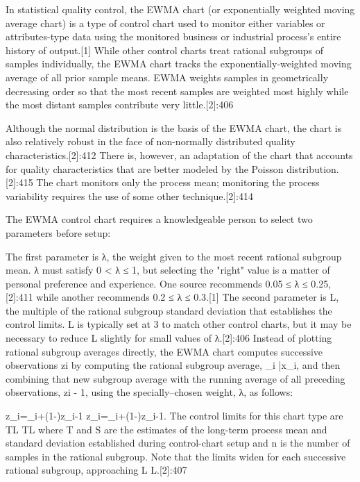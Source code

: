 In statistical quality control, the EWMA chart (or exponentially weighted moving average chart) is a type of control chart used to monitor either variables or attributes-type data using the monitored business or industrial process's entire history of output.[1] While other control charts treat rational subgroups of samples individually, the EWMA chart tracks the exponentially-weighted moving average of all prior sample means. EWMA weights samples in geometrically decreasing order so that the most recent samples are weighted most highly while the most distant samples contribute very little.[2]:406

Although the normal distribution is the basis of the EWMA chart, the chart is also relatively robust in the face of non-normally distributed quality characteristics.[2]:412 There is, however, an adaptation of the chart that accounts for quality characteristics that are better modeled by the Poisson distribution.[2]:415 The chart monitors only the process mean; monitoring the process variability requires the use of some other technique.[2]:414

The EWMA control chart requires a knowledgeable person to select two parameters before setup:

The first parameter is λ, the weight given to the most recent rational subgroup mean. λ must satisfy 0 < λ ≤ 1, but selecting the "right" value is a matter of personal preference and experience. One source recommends 0.05 ≤ λ ≤ 0.25,[2]:411 while another recommends 0.2 ≤ λ ≤ 0.3.[1]
The second parameter is L, the multiple of the rational subgroup standard deviation that establishes the control limits. L is typically set at 3 to match other control charts, but it may be necessary to reduce L slightly for small values of λ.[2]:406
Instead of plotting rational subgroup averages directly, the EWMA chart computes successive observations zi by computing the rational subgroup average, {_{i}} {\bar  x}_{i}, and then combining that new subgroup average with the running average of all preceding observations, zi - 1, using the specially–chosen weight, λ, as follows:

{\displaystyle z_{i}=_{i}+\left(1-\lambda \right)z_{i-1}} z_{i}=_{i}+\left(1-\lambda \right)z_{{i-1}}.
The control limits for this chart type are {\displaystyle T\pm L{}{}} T\pm L{}{} where T and S are the estimates of the long-term process mean and standard deviation established during control-chart setup and n is the number of samples in the rational subgroup. Note that the limits widen for each successive rational subgroup, approaching {\displaystyle \pm L{}{}} {\displaystyle \pm L{}{}}.[2]:407


